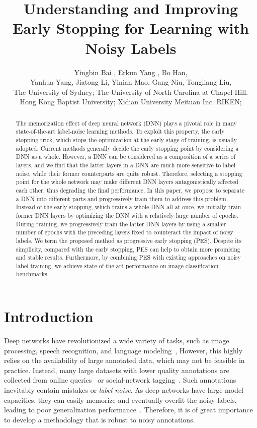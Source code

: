 \documentclass[11pt]{article}
\title{Understanding and Improving Early Stopping for Learning with Noisy Labels}
\author{
  Yingbin Bai \footnotemark[1] ,
  Erkun Yang \footnotemark[1] ,
  Bo Han, \\
  Yanhua Yang, 
  Jiatong Li, 
  Yinian Mao,
  Gang Niu,
  Tongliang Liu, \\

  \small{The University of Sydney;}
  \small{The University of North Carolina at Chapel Hill.} \\
  \small{Hong Kong Baptist University;}
  \small{Xidian University}
  \small{Meituan Inc.}
  \small{RIKEN;}
}
\date{}
\begin{document}
\maketitle
\begin{abstract}
The memorization effect of deep neural network (DNN) plays a pivotal role in many state-of-the-art label-noise learning methods. To exploit this property, the early stopping trick, which stops the optimization at the early stage of training, is usually adopted. Current methods generally decide the early stopping point by considering a DNN as a whole. However, a DNN can be considered as a composition of a series of layers, and we find that the latter layers in a DNN are much more sensitive to label noise, while their former counterparts are quite robust. Therefore, selecting a stopping point for the whole network may make different DNN layers antagonistically affected each other, thus degrading the final performance. In this paper, we propose to separate a DNN into different parts and progressively train them to address this problem. Instead of the early stopping, which trains a whole DNN all at once, we initially train former DNN layers by optimizing the DNN with a relatively large number of epochs. During training, we progressively train the latter DNN layers by using a smaller number of epochs with the preceding layers fixed to counteract the impact of noisy labels. We term the proposed method as progressive early stopping (PES). Despite its simplicity, compared with the early stopping, PES can help to obtain more promising and stable results. Furthermore, by combining PES with existing approaches on noisy label training, we achieve state-of-the-art performance on image classification benchmarks.
\end{abstract}



\newpage


\section{Introduction}
Deep networks have revolutionized a wide variety of tasks, such as image processing, speech recognition, and language modeling~\cite{goodfellow2016deep}, However, this highly relies on the availability of large annotated data, which may not be feasible in practice. Instead, many large datasets with lower quality annotations are collected from online queries~\cite{cha2012social} or social-network tagging~\cite{liu2011noise}. Such annotations inevitably contain mistakes or \emph{label noise}. As deep networks have large model capacities, they can easily memorize and eventually overfit the noisy labels, leading to poor generalization performance~\cite{zhang2016understanding}. Therefore, it is of great importance to develop a methodology that is robust to noisy annotations.
\end{document}
